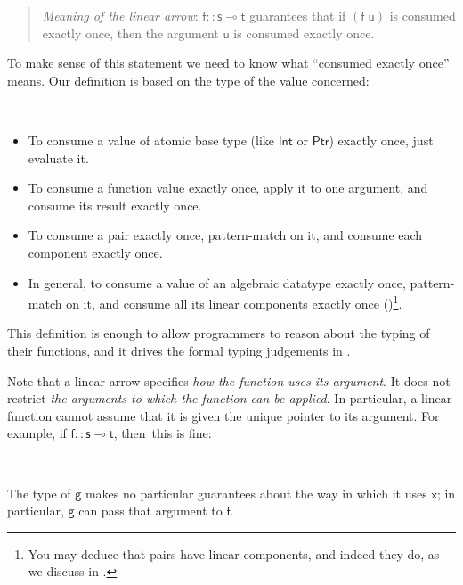 \documentclass[acmsmall,screen]{acmart}\settopmatter{}
\newcommand{\Conid}[1]{\mathit{#1}}
\newcommand{\Varid}[1]{\mathit{#1}}
\def\resethooks{%
  \global\let\SaveRestoreHook\empty
  \global\let\ColumnHook\empty}
\let\hspre\empty
\let\hspost\empty
\renewcommand\Varid[1]{\mathord{\textsf{#1}}}
\renewcommand\Conid[1]{\mathord{\textsf{#1}}}
\begin{document}
\begin{quote}
\emph{Meaning of the linear arrow}:
\ensuremath{\Varid{f}\mathbin{::}\Varid{s}\mathbin{⊸}\Varid{t}} guarantees that if \ensuremath{(\Varid{f}\;\Varid{u})} is consumed exactly once,
then the argument \ensuremath{\Varid{u}} is consumed exactly once.
\end{quote}
To make sense of this statement we need to know what ``consumed exactly once'' means.
Our definition is based on the type of the value concerned:
\begin{definition}~ \label{def:consume}
\begin{itemize}
\item To consume a value of atomic base type (like \ensuremath{\Conid{Int}} or \ensuremath{\Conid{Ptr}}) exactly once, just evaluate it.
\item To consume a function value exactly once, apply it to one argument, and consume its result exactly once.
\item To consume a pair exactly once, pattern-match on it, and consume each component exactly once.
\item In general, to consume a value of an algebraic datatype exactly once, pattern-match on it,
  and consume all its linear components exactly once
  ()\footnote{You may deduce that pairs have linear components,
    and indeed they do, as we discuss in .}.
\end{itemize}
\end{definition}
\noindent
This definition is enough to allow programmers to reason about the
typing of their functions, and it drives the formal typing judgements in
.

Note that a linear arrow specifies \emph{how the function uses its argument}. It does not
restrict \emph{the arguments to which the function can be applied}.
In particular, a linear function cannot assume that it is given the
unique pointer to its argument.  For example, if \ensuremath{\Varid{f}\mathbin{::}\Varid{s}\mathbin{⊸}\Varid{t}}, then\
this is fine:
\begin{hscode}\SaveRestoreHook
\column{B}{@{}>{\hspre}l<{\hspost}@{}}%
\column{E}{@{}>{\hspre}l<{\hspost}@{}}%
\>[B]{}\Varid{g}\mathbin{::}\Varid{s}\to \Varid{t}{}\<[E]%
\\
\>[B]{}\Varid{g}\;\Varid{x}\mathrel{=}\Varid{f}\;\Varid{x}{}\<[E]%
\ColumnHook
\end{hscode}\resethooks
The type of \ensuremath{\Varid{g}} makes no particular guarantees about the way in which it uses \ensuremath{\Varid{x}};
in particular, \ensuremath{\Varid{g}} can pass that argument to \ensuremath{\Varid{f}}.
\end{document}
